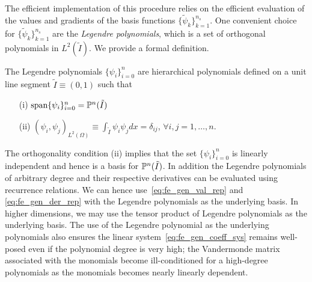 The efficient implementation of this procedure relies on the efficient evaluation of the values and gradients of the basis functions $\{\tilde \psi_k \}_{k=1}^{n_s}$. One convenient choice for $\{\tilde \psi_k \}_{k=1}^{n_s}$ are the \emph{Legendre polynomials}, which is a set of orthogonal polynomials in $L^2(\tilde I)$. We provide a formal definition.
\begin{definition}
  \label{def:fe_legendre_poly}
  The Legendre polynomials $\{ \psi_i \}_{i=0}^{n}$ are hierarchical polynomials defined on a unit line segment $\tilde I \equiv (0,1)$ such that
  \begin{itemize}
  \item[(i)] $\text{span}\{ \psi_i \}_{i=0}^n = \mathbb{P}^{n}(\tilde I)$  
  \item[(ii)] $(\psi_i,\psi_j)_{L^2(\Omega)} \equiv \int_{\tilde I} \psi_i \psi_j dx =  \delta_{ij}$, $\forall i,j = 1,\dots,n$. 
  \end{itemize}
\end{definition}
The orthogonality condition (ii) implies that the set $\{ \psi_i \}_{i=0}^{n}$ is linearly independent and hence is a basis for $\mathbb{P}^n(\tilde I)$. In addition the Legendre polynomials of arbitrary degree and their respective derivatives can be evaluated using recurrence relations. We can hence use~\eqref{eq:fe_gen_val_rep} and \eqref{eq:fe_gen_der_rep} with the Legendre polynomials as the underlying basis.  In higher dimensions, we may use the tensor product of Legendre polynomials as the underlying basis.  The use of the Legendre polynomial as the underlying polynomials also ensures the linear system~\eqref{eq:fe_gen_coeff_sys} remains well-posed even if the polynomial degree is very high; the Vandermonde matrix associated with the monomials become ill-conditioned for a high-degree polynomials as the monomials becomes nearly linearly dependent.

